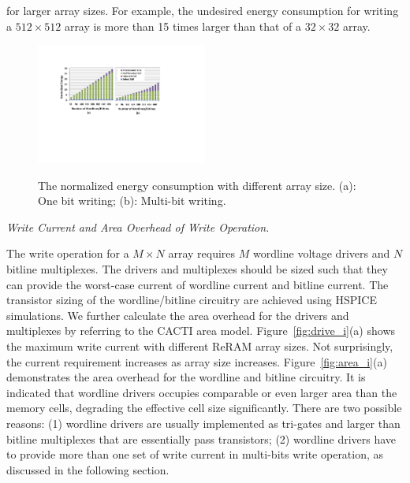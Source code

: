 for larger array sizes. For example, the undesired energy consumption for
writing a $512{\times}512$ array is more than 15 times larger than that of
a $32{\times}32$ array.
\begin{figure}%
\centering
  \includegraphics[width=0.5\textwidth]{./figures/energy_f_tall2.pdf}\\
  \caption{The normalized energy consumption with different array size. (a): One bit writing; (b): Multi-bit writing.}\label{fig:energy}
    \vspace{-10pt}
\end{figure}

\vspace{6pt} \emph{Write Current and Area Overhead of Write Operation.}
\vspace{6pt}

The write operation for a $M \times N$ array requires $M$ wordline voltage
drivers and $N$ bitline multiplexes. The drivers and multiplexes should
be sized such that they can provide the worst-case current of wordline
current and bitline current. The transistor sizing of the wordline/bitline
circuitry are achieved using HSPICE simulations. We further calculate the
area overhead for the drivers and multiplexes by referring to the CACTI
area model. Figure~\ref{fig:drive_i}(a) shows the maximum write current
with different ReRAM array sizes. Not surprisingly, the current requirement
increases as array size increases. Figure~\ref{fig:area_i}(a)
demonstrates the area overhead for the wordline and bitline circuitry. It
is indicated that wordline drivers occupies comparable or even larger area
than the memory cells, degrading the effective cell size significantly.
There are two possible reasons: (1) wordline drivers are usually
implemented as tri-gates and larger than bitline multiplexes that are
essentially pass transistors; (2) wordline drivers have to provide more
than one set of write current in multi-bits write operation, as discussed
in the following section.

